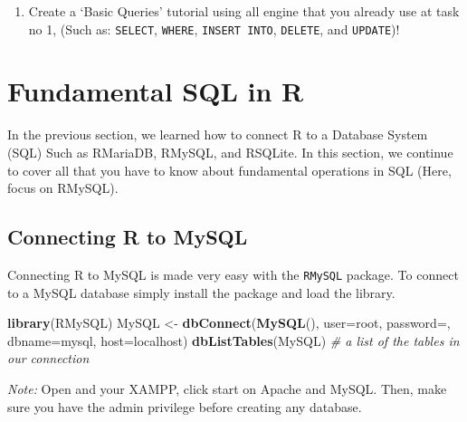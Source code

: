 \documentclass[
]{book}
\newenvironment{Shaded}{\begin{snugshade}}{\end{snugshade}}
\newcommand{\AttributeTok}[1]{\textcolor[rgb]{0.13,0.29,0.53}{#1}}
\newcommand{\CommentTok}[1]{\textcolor[rgb]{0.56,0.35,0.01}{\textit{#1}}}
\newcommand{\FunctionTok}[1]{\textcolor[rgb]{0.13,0.29,0.53}{\textbf{#1}}}
\newcommand{\NormalTok}[1]{#1}
\newcommand{\OtherTok}[1]{\textcolor[rgb]{0.56,0.35,0.01}{#1}}
\newcommand{\StringTok}[1]{\textcolor[rgb]{0.31,0.60,0.02}{#1}}
\providecommand{\tightlist}{%
  \setlength{\itemsep}{0pt}\setlength{\parskip}{0pt}}
\begin{document}
\begin{enumerate}
\def\labelenumi{\arabic{enumi}.}
\setcounter{enumi}{1}
\tightlist
\item
  Create a `Basic Queries' tutorial using all engine that you already use at task no 1, (Such as: \texttt{SELECT}, \texttt{WHERE}, \texttt{INSERT\ INTO}, \texttt{DELETE}, and \texttt{UPDATE})!
\end{enumerate}

\hypertarget{fundamental-sql-in-r}{%
\chapter{Fundamental SQL in R}\label{fundamental-sql-in-r}}

In the previous section, we learned how to connect R to a Database System (SQL) Such as RMariaDB, RMySQL, and RSQLite. In this section, we continue to cover all that you have to know about fundamental operations in SQL (Here, focus on RMySQL).

\hypertarget{connecting-r-to-mysql}{%
\section{Connecting R to MySQL}\label{connecting-r-to-mysql}}

Connecting R to MySQL is made very easy with the \texttt{RMySQL} package. To connect to a MySQL database simply install the package and load the library.

\begin{Shaded}
\begin{Highlighting}[]
\FunctionTok{library}\NormalTok{(RMySQL)}
\NormalTok{MySQL }\OtherTok{\textless{}{-}} \FunctionTok{dbConnect}\NormalTok{(}\FunctionTok{MySQL}\NormalTok{(), }
                  \AttributeTok{user=}\StringTok{\textquotesingle{}root\textquotesingle{}}\NormalTok{,}
                  \AttributeTok{password=}\StringTok{\textquotesingle{}\textquotesingle{}}\NormalTok{, }
                  \AttributeTok{dbname=}\StringTok{\textquotesingle{}mysql\textquotesingle{}}\NormalTok{, }
                  \AttributeTok{host=}\StringTok{\textquotesingle{}localhost\textquotesingle{}}\NormalTok{)}
\FunctionTok{dbListTables}\NormalTok{(MySQL)                  }\CommentTok{\# a list of the tables in our connection}
\end{Highlighting}
\end{Shaded}

\emph{Note:} Open and your XAMPP, click start on Apache and MySQL. Then, make sure you have the admin privilege before creating any database.
\end{document}
